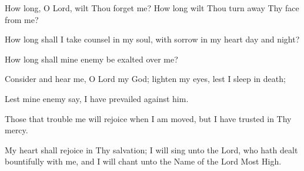 How long, O Lord, wilt Thou forget me? How long wilt Thou turn away Thy face from me?

How long shall I take counsel in my soul, with sorrow in my heart day and night?

How long shall mine enemy be exalted over me?

Consider and hear me, O Lord my God; lighten my eyes, lest I sleep in death;

Lest mine enemy say, I have prevailed against him.

Those that trouble me will rejoice when I am moved, but I have trusted in Thy mercy.

My heart shall rejoice in Thy salvation; I will sing unto the Lord, who hath dealt bountifully with me, and I will chant unto the Name of the Lord Most High.
